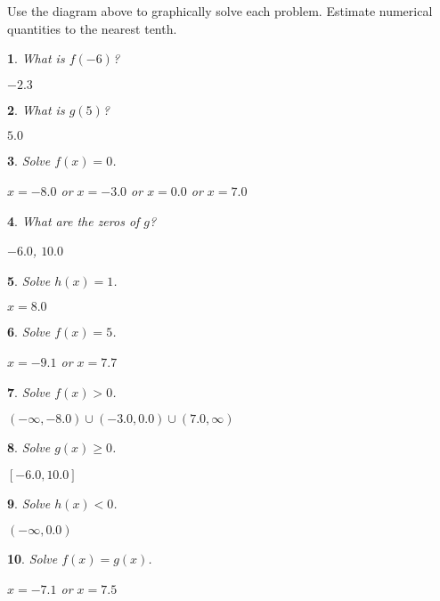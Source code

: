 \documentclass{amsbook}
\newtheorem{exc}{}
\newenvironment{ex}{\begin{exc}\normalfont}{\end{exc}}
\numberwithin{section}{chapter}
\numberwithin{equation}{chapter}
\begin{document}
Use the diagram above to graphically solve each problem. Estimate numerical quantities to the nearest tenth.

\begin{multicols}{2}
\begin{ex}
	What is $f(-6)$?
	\begin{sol}
		$-2.3$
	\end{sol}
\end{ex}
\begin{ex}
	What is $g(5)$?
	\begin{sol}
		$5.0$
	\end{sol}
\end{ex}
\begin{ex}
	Solve $f(x)=0$.
	\begin{sol}
		$x=-8.0$ or $x=-3.0$ or $x=0.0$ or $x=7.0$
	\end{sol}
\end{ex}
\begin{ex}
	What are the zeros of $g$?
	\begin{sol}
		$-6.0$, $10.0$
	\end{sol}
\end{ex}
\begin{ex}
	Solve $h(x)=1$.
	\begin{sol}
		$x=8.0$
	\end{sol}
\end{ex}
\begin{ex}
	Solve $f(x)=5$.
	\begin{sol}
		$x=-9.1$ or $x=7.7$
	\end{sol}
\end{ex}
\begin{ex}
	Solve $f(x) > 0$.
	\begin{sol}
		$(-\infty,-8.0)\cup(-3.0,0.0)\cup(7.0,\infty)$
	\end{sol}
\end{ex}
\begin{ex}
	Solve $g(x) \geq 0$.
	\begin{sol}
		$[-6.0,10.0]$
	\end{sol}
\end{ex}
\begin{ex}
	Solve $h(x) < 0$.
	\begin{sol}
		$(-\infty, 0.0)$
	\end{sol}
\end{ex}
\begin{ex}
	Solve $f(x) = g(x)$.
	\begin{sol}
		$x=-7.1$ or $x=7.5$
	\end{sol}

\end{ex}
\end{multicols}
\end{document}
